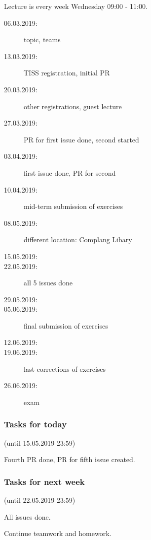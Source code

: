 

\date{15.05.2018}



\renewcommand{\enquote}[1]{\emph{``#1''}} %

\begin{frame}
	\titlepage
	\doclicenseThis
\end{frame}


\begin{frame}
	Lecture is every week Wednesday 09:00 - 11:00.

	\begin{description}
		\item[06.03.2019:] {\color{gray}topic, teams}
		\item[13.03.2019:] {\color{gray}TISS registration, initial PR}
		\item[20.03.2019:] {\color{gray}other registrations, guest lecture}
		\item[27.03.2019:] {\color{gray}PR for first issue done, second started}
		\item[03.04.2019:] {\color{gray}first issue done, PR for second}
		\item[10.04.2019:] {\color{gray}mid-term submission of exercises}
		\item[08.05.2019:] {\color{gray}different location: Complang Libary}
		\item[15.05.2019:]
		\item[22.05.2019:] all 5 issues done
		\item[29.05.2019:]
		\item[05.06.2019:] final submission of exercises
		\item[12.06.2019:]
		\item[19.06.2019:] last corrections of exercises
		\item[26.06.2019:] exam
	\end{description}
\end{frame}

\begin{assignment}
	\frametitle{Tasks for today}
	(until 15.05.2019 23:59)

	\begin{task}
	Fourth PR done, PR for fifth issue created.
	\end{task}
\end{assignment}

\begin{assignment}
	\frametitle{Tasks for next week}
	(until 22.05.2019 23:59)

	\begin{task}
	All issues done.
	\end{task}

	\begin{task}
	Continue teamwork and homework.
	\end{task}
\end{assignment}

